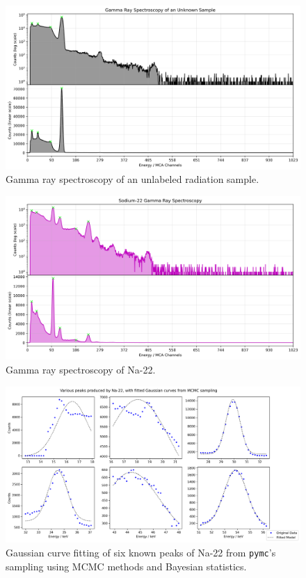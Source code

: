 \documentclass[12pt]{article}
\begin{document}
\begin{figure}[H]
    \centering
    \includegraphics[width=0.98\linewidth]{figs/fig9.png}
    \caption{
        Gamma ray spectroscopy of an unlabeled radiation sample.
    }
\end{figure}
\begin{figure}[H]
    \centering
    \includegraphics[width=0.98\linewidth]{figs/fig10.png}
    \caption{
        Gamma ray spectroscopy of Na-22.
    }
\end{figure}
\newpage
\begin{figure}[H]
    \centering
    \includegraphics[width=0.98\linewidth]{figs/fig11.png}
    \caption{
        Gaussian curve fitting of six known peaks of Na-22 from \texttt{pymc}'s
        sampling using MCMC methods and Bayesian statistics.
    }
\end{figure}
\end{document}

